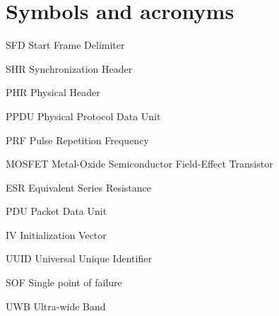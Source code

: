 \documentclass[\main/main.tex]{subfiles}
\begin{document}
\chapter*{Symbols and acronyms}
\begin{abbrv}
    \item[SFD]  Start Frame Delimiter
    \item[SHR]  Synchronization Header
    \item[PHR]  Physical Header
    \item[PPDU] Physical Protocol Data Unit
    \item[PRF]  Pulse Repetition Frequency
    \item[MOSFET]  Metal-Oxide Semiconductor Field-Effect Transistor
    \item[ESR]  Equivalent Series Resistance
    \item[PDU] Packet Data Unit
    \item[IV] Initialization Vector
    \item[UUID] Universal Unique Identifier 
    \item[SOF] Single point of failure 
    \item[UWB] Ultra-wide Band 
\end{abbrv}
\end{document}
